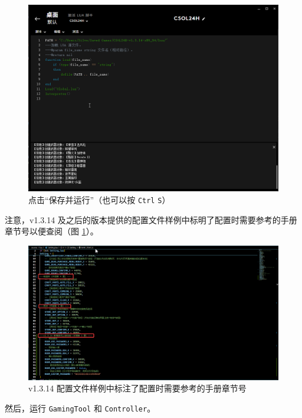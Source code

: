\begin{figure}[H]
    \Centering
    \includegraphics[width=\textwidth]{docs/assets/update/save_and_run_01.png}
    \caption{点击“保存并运行”（也可以按 \lstinline{Ctrl} \lstinline{S}）}
\end{figure}

注意，v1.3.14 及之后的版本提供的配置文件样例中标明了配置时需要参考的手册章节号以便查阅（图 \ref{ch5fig-section-number-in-conf}）。

\begin{figure}[H]
    \Centering
    \includegraphics[width=\textwidth]{docs/assets/update/section_number_in_conf.png}
    \caption{v1.3.14 配置文件样例中标注了配置时需要参考的手册章节号}
    \label{ch5fig-section-number-in-conf}
\end{figure}

然后，运行 \lstinline{GamingTool} 和 \lstinline{Controller}。


